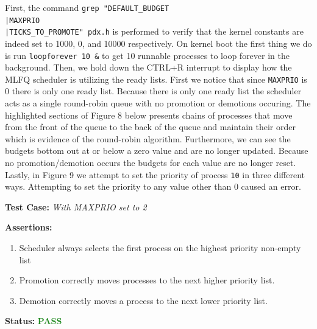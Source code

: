 \documentclass[11pt,letterpaper]{report}
\newcommand{\code}[1]{\colorbox{codegray}{\texttt{#1}}}
\begin{document}
{  First, the command \code{grep "DEFAULT\_BUDGET\\|MAXPRIO\\|TICKS\_TO\_PROMOTE" pdx.h} is performed
  to verify that the kernel constants are indeed set to 1000, 0, and 10000 respectively. On 
  kernel boot the first thing we do is run \code{loopforever 10 \&} to get 10 runnable processes
  to loop forever in the background. Then, we hold down the CTRL+R interrupt to display how the 
  MLFQ scheduler is utilizing the ready lists. First we notice that since \code{MAXPRIO} is 0 
  there is only one ready list. Because there is only one ready list the scheduler acts as a 
  single round-robin queue with no promotion or demotions occuring. The highlighted 
  sections of Figure 8 below presents chains of processes that move from the front of the 
  queue to the back of the queue and maintain their order which is evidence of the round-robin
  algorithm. Furthermore, we can see the budgets bottom out at or below a zero value and are 
  no longer updated. Because no promotion/demotion occurs the budgets for each value are no longer
  reset. Lastly, in Figure 9 we attempt to set the priority of process \code{10} in three different 
  ways. Attempting to set the priority to any value other than 0 caused an error. 

  \pagebreak

  \noindent\textbf{Test Case:} \emph{With MAXPRIO set to 2}
  
  \noindent\textbf{Assertions:}
  \begin{enumerate}[]
  \item Scheduler always selects the first process on the highest priority non-empty list
  \item Promotion correctly moves processes to the next higher priority list. 
  \item Demotion correctly moves a process to the next lower priority list.
  \end{enumerate}  
  
  \noindent\textbf{Status:} \textcolor{ForestGreen}{\textbf{PASS}}\\
  
}
\end{document}
